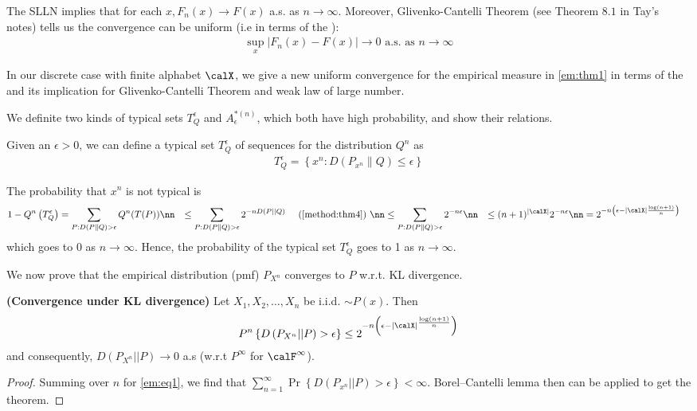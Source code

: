 \documentclass{article}
\newcommand{\bfs}[1]{\textbf{({#1})}}
\begin{document}
The SLLN implies that for each $x, F_{n}(x) \rightarrow F(x)$ a.s. as $n \rightarrow \infty$. Moreover, Glivenko-Cantelli Theorem (see Theorem $8.1$ in Tay's notes) tells us the convergence can be uniform (i.e in terms of the ):
\begin{align*}
\sup _{x}\left|F_{n}(x)-F(x)\right| \rightarrow 0 \text { a.s. as } n \rightarrow \infty
\end{align*}

In our discrete case with finite alphabet $\calX$, we give a new uniform convergence for the empirical measure in \cref{em:thm1} in terms of the  and its implication for Glivenko-Cantelli Theorem and weak law of large number.

We definite two kinds of typical sets $T_{Q}^{\epsilon}$ and $A_{\epsilon}^{*(n)}$, which both have high probability, and show their relations.

\begin{defa}{}
Given an $\epsilon>0$, we can define a typical set $T_{Q}^{\epsilon}$ of sequences for the distribution $Q^{n}$ as
\begin{align}
T_{Q}^{\epsilon}=\left\{x^{n}: D\left(P_{x^{n}} \| Q\right) \leq \epsilon\right\} \label{em:eq2}
\end{align}
\end{defa}


The probability that $x^{n}$ is not typical is
\begin{align}
1-Q^{n}\left(T_{Q}^{\epsilon}\right) &=\sum_{P: D(P \| Q)>\epsilon} Q^{n}(T(P)) \nn
& \leq \sum_{P: D(P \| Q)>\epsilon} 2^{-n D(P|| Q)} \quad \text { (\cref{method:thm4}) } \nn
& \leq \sum_{P: D(P \| Q)>\epsilon} 2^{-n \epsilon} \nn
& \leq(n+1)^{| \calX |} 2^{-n \epsilon} \nn
&=2^{-n\left(\epsilon-| \calX | \frac{\log (n+1)}{n}\right)} \label{em:eq1}
\end{align}
which goes to 0 as $n \rightarrow \infty$. Hence, the probability of the typical set $T_{Q}^{\epsilon}$ goes to 1 as $n \rightarrow \infty$. 

We now prove that the empirical distribution (pmf) $P_{X^{n}}$ converges to $P$ w.r.t. KL divergence. 

\begin{thma}{\bfs{Convergence under KL divergence}} \label{em:thm1}
Let $X_{1}, X_{2}, \ldots, X_{n}$ be i.i.d. $\sim P(x) .$ Then
\begin{align*}
P^n\left\{D\left(P_{X^{n}}|| P\right)>\epsilon\right\} \leq 2^{-n\left(\epsilon-| \calX |^{\frac{\log (n+1)}{n}}\right)}
\end{align*}
and consequently, $D\left(P_{X^{n}}|| P\right) \rightarrow 0$ a.s (w.r.t $P^\infty$ for $\calF^\infty$).
\end{thma} 
\begin{proof}
Summing over $n$ for \cref{em:eq1}, we find that $\sum_{n=1}^{\infty} \operatorname{Pr}\left\{D\left(P_{x^{n}}|| P\right)>\epsilon\right\}<\infty
$. Borel–Cantelli lemma then can be applied to get the theorem.
 \end{proof} 
\end{document}
